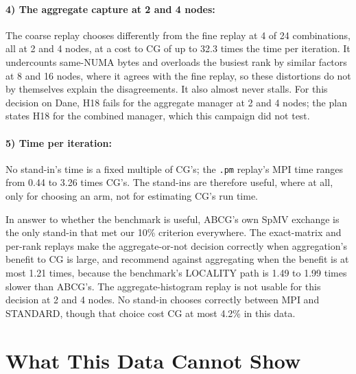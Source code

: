 \documentclass[11pt]{article}
\newcommand{\pmrep}{\texttt{.pm} replay}
\begin{document}
\paragraph{4) The aggregate capture at 2 and 4 nodes:} The coarse replay chooses
differently from the fine replay at 4 of 24 combinations, all at 2 and 4 nodes, at a
cost to CG of up to 32.3 times the time per iteration. It undercounts same-NUMA bytes and
overloads the busiest rank by similar factors at 8 and 16 nodes, where it agrees with the
fine replay, so these distortions do not by themselves explain the disagreements. It also
almost never stalls. For this decision on Dane, H18 fails for the aggregate manager at 2
and 4 nodes; the plan states H18 for the combined manager, which this campaign did not
test.

\paragraph{5) Time per iteration:} No stand-in's time is a fixed multiple of CG's; the
\pmrep's MPI time ranges from 0.44 to 3.26 times CG's. The stand-ins are therefore useful,
where at all, only for choosing an arm, not for estimating CG's run time.

In answer to whether the benchmark is useful, ABCG's own SpMV exchange is the only
stand-in that met our 10\% criterion everywhere. The exact-matrix and per-rank replays
make the aggregate-or-not decision correctly when aggregation's benefit to CG is large,
and recommend against aggregating when the benefit is at most 1.21 times, because the
benchmark's LOCALITY path is 1.49 to 1.99 times slower than ABCG's. The aggregate-histogram
replay is not usable for this decision at 2 and 4 nodes. No stand-in chooses correctly
between MPI and STANDARD, though that choice cost CG at most 4.2\% in this data.

\section{What This Data Cannot Show}
\label{sec:limits}
\end{document}
